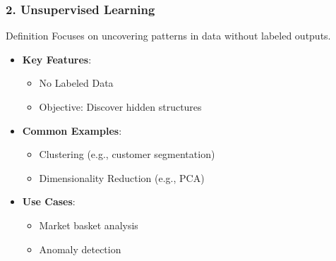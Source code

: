 \documentclass[aspectratio=169]{beamer}
\begin{document}
\begin{frame}[fragile]
    \frametitle{2. Unsupervised Learning}
    \begin{block}{Definition}
        Focuses on uncovering patterns in data without labeled outputs.
    \end{block}

    \begin{itemize}
        \item \textbf{Key Features}:
            \begin{itemize}
                \item No Labeled Data
                \item Objective: Discover hidden structures
            \end{itemize}

        \item \textbf{Common Examples}:
            \begin{itemize}
                \item Clustering (e.g., customer segmentation)
                \item Dimensionality Reduction (e.g., PCA)
            \end{itemize}

        \item \textbf{Use Cases}:
            \begin{itemize}
                \item Market basket analysis
                \item Anomaly detection
            \end{itemize}
    \end{itemize}
\end{frame}
\end{document}
